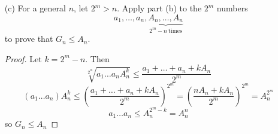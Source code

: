 \documentclass{article}
\begin{document}
\begin{enumerate}
	\begin{proof}
		Let $k = 1$. Then $n=2$, so we know that $G_n \le A_n$ is true.

		Now suppose that $G_n \le A_n$ is true for some number $n = 2^k$, and let $m = 2^{k+1}$. Then \[G_m =\sqrt[m]{a_1\dots a_m} = \sqrt{\sqrt[n]{a_1\dots a_n}\sqrt[n]{a_{n+1}\dots a_m}}.\] Since we know that $G_2 \le A_2$, \[\sqrt{\sqrt[n]{a_1\dots a_n}\sqrt[n]{a_{n+1}\dots a_m}} \le \frac{\sqrt[n]{a_1\dots a_2} + \sqrt[n]{a_{n+1}\dots a_m}}{2}.\] Also, since $G_n \le A_n$, \[\frac{\sqrt[n]{a_1\dots a_2} + \sqrt[n]{a_{n+1}\dots a_m}}{2} \le \frac{\frac{a_1 + \dots + a_n}{n} + \frac{a_{n+1} + \dots + a_m}{n}}{2} = \frac{a_1 + \dots + a_m}{2n} = A_m,\] so $G_m \le A_m$.
	\end{proof}

	\item[(c)] For a general $n$, let $2^m > n$. Apply part (b) to the $2^m$ numbers \[a_1, \dots, a_n, \underbrace{A_n, \dots, A_n}_{2^m-n~\text{times}}\] to prove that $G_n \le A_n$.
	
	\begin{proof}
		Let $k = 2^m - n$. Then
		\[\sqrt[2^m]{a_1\dots a_nA_n^k} \le \frac{a_1 + \dots + a_n + kA_n}{2^m}\]
		\[(a_1\dots a_n)A_n^k \le \left(\frac{a_1 + \dots + a_n + kA_n}{2^m}\right)^{2^m} = \left(\frac{nA_n + kA_n}{2^m}\right)^{2^m} = A_n^{2^m}\]
		\[a_1\dots a_n \le A_n^{2^m - k} = A_n^n\] so $G_n \le A_n$
	\end{proof}
\end{enumerate}
\end{document}

